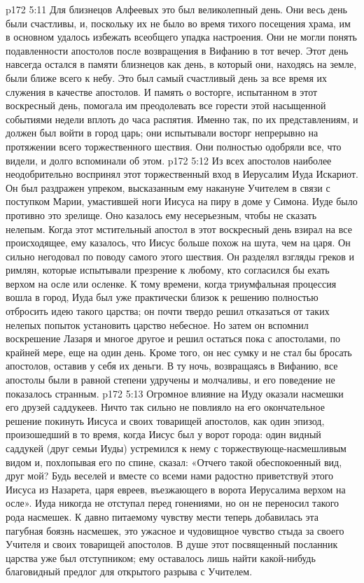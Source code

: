 \vs p172 5:11 Для близнецов Алфеевых это был великолепный день. Они весь день были счастливы, и, поскольку их не было во время тихого посещения храма, им в основном удалось избежать всеобщего упадка настроения. Они не могли понять подавленности апостолов после возвращения в Вифанию в тот вечер. Этот день навсегда остался в памяти близнецов как день, в который они, находясь на земле, были ближе всего к небу. Это был самый счастливый день за все время их служения в качестве апостолов. И память о восторге, испытанном в этот воскресный день, помогала им преодолевать все горести этой насыщенной событиями недели вплоть до часа распятия. Именно так, по их представлениям, и должен был войти в город царь; они испытывали восторг непрерывно на протяжении всего торжественного шествия. Они полностью одобряли все, что видели, и долго вспоминали об этом.
\vs p172 5:12 Из всех апостолов наиболее неодобрительно воспринял этот торжественный вход в Иерусалим Иуда Искариот. Он был раздражен упреком, высказанным ему накануне Учителем в связи с поступком Марии, умастившей ноги Иисуса на пиру в доме у Симона. Иуде было противно это зрелище. Оно казалось ему несерьезным, чтобы не сказать нелепым. Когда этот мстительный апостол в этот воскресный день взирал на все происходящее, ему казалось, что Иисус больше похож на шута, чем на царя. Он сильно негодовал по поводу самого этого шествия. Он разделял взгляды греков и римлян, которые испытывали презрение к любому, кто согласился бы ехать верхом на осле или осленке. К тому времени, когда триумфальная процессия вошла в город, Иуда был уже практически близок к решению полностью отбросить идею такого царства; он почти твердо решил отказаться от таких нелепых попыток установить царство небесное. Но затем он вспомнил воскрешение Лазаря и многое другое и решил остаться пока с апостолами, по крайней мере, еще на один день. Кроме того, он нес сумку и не стал бы бросать апостолов, оставив у себя их деньги. В ту ночь, возвращаясь в Вифанию, все апостолы были в равной степени удручены и молчаливы, и его поведение не показалось странным.
\vs p172 5:13 Огромное влияние на Иуду оказали насмешки его друзей саддукеев. Ничто так сильно не повлияло на его окончательное решение покинуть Иисуса и своих товарищей апостолов, как один эпизод, произошедший в то время, когда Иисус был у ворот города: один видный саддукей (друг семьи Иуды) устремился к нему с торжествующе\hyp{}насмешливым видом и, похлопывая его по спине, сказал: «Отчего такой обеспокоенный вид, друг мой? Будь веселей и вместе со всеми нами радостно приветствуй этого Иисуса из Назарета, царя евреев, въезжающего в ворота Иерусалима верхом на осле». Иуда никогда не отступал перед гонениями, но он не переносил такого рода насмешек. К давно питаемому чувству мести теперь добавилась эта пагубная боязнь насмешек, это ужасное и чудовищное чувство стыда за своего Учителя и своих товарищей апостолов. В душе этот посвященный посланник царства уже был отступником; ему оставалось лишь найти какой\hyp{}нибудь благовидный предлог для открытого разрыва с Учителем.
